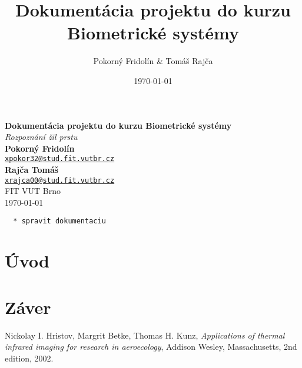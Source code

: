 \documentclass[12pt,a4paper]{article}
\begin{document}
\title{Dokumentácia projektu do kurzu Biometrické systémy}
\author{Pokorný Fridolín \& Tomáš Rajča}
\date{\today}

\vspace*{\fill}
\begin{center}
\textbf{\Huge\textbf{Dokumentácia projektu do kurzu Biometrické systémy}} \\
\vspace{8mm}
\textit{\Large\color{gray} Rozpoznání žil prstu}\\
\vspace*{\fill}
\vspace*{\fill}
\hfill\textbf{Pokorný Fridolín} \\
\hfill{\href{mailto:xpokor32@stud.fit.vutbr.cz}{\nolinkurl{xpokor32@stud.fit.vutbr.cz}}} \\
\hfill\textbf{Rajča Tomáš} \\
\hfill{\href{mailto:xrajca00@stud.fit.vutbr.cz}{\nolinkurl{xrajca00@stud.fit.vutbr.cz}}} \\
\hfill{FIT VUT Brno} \\
\hfill\today
\end{center}
\vspace*{\fill}

\thispagestyle{empty}
\clearpage

\begin{verbatim}
  * spravit dokumentaciu
\end{verbatim}

\setcounter{page}{1}
\clearpage

\section{Úvod} \label{uvod}

\section{Záver} \label{zaver}

\clearpage



\begin{thebibliography}{99}

  {Nickolay I. Hristov, Margrit Betke, Thomas H. Kunz},
  \emph{Applications of thermal infrared imaging for research in aeroecology},
  Addison Wesley, Massachusetts,
  2nd edition,
  2002.

\end{thebibliography}
\end{document}
